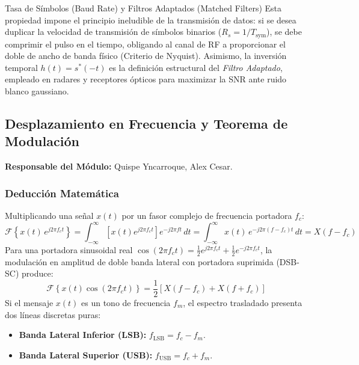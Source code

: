 \documentclass[11pt,a4paper]{article}
\begin{document}
\begin{telecomAppBox}{Tasa de S\'imbolos (Baud Rate) y Filtros Adaptados (Matched Filters)}
Esta propiedad impone el principio ineludible de la transmisi\'on de datos: si se desea duplicar la velocidad de transmisi\'on de s\'imbolos binarios ($R_s = 1/T_{\text{sym}}$), se debe comprimir el pulso en el tiempo, obligando al canal de RF a proporcionar el doble de ancho de banda f\'isico (Criterio de Nyquist). Asimismo, la inversi\'on temporal $h(t) = s^*(-t)$ es la definici\'on estructural del \textit{Filtro Adaptado}, empleado en radares y receptores \'opticos para maximizar la SNR ante ruido blanco gaussiano.
\end{telecomAppBox}

\subsection{Desplazamiento en Frecuencia y Teorema de Modulaci\'on}
\textbf{Responsable del M\'odulo:} Quispe Yncarroque, Alex Cesar.

\subsubsection{Deducci\'on Matem\'atica}
Multiplicando una se\~nal $x(t)$ por un fasor complejo de frecuencia portadora $f_c$:
\begin{equation}
  \mathcal{F}\left\{ x(t) \, e^{j 2\pi f_c t} \right\} = \int_{-\infty}^{\infty} \left[ x(t) e^{j 2\pi f_c t} \right] e^{-j 2\pi f t} \, dt = \int_{-\infty}^{\infty} x(t) \, e^{-j 2\pi (f - f_c) t} \, dt = X(f - f_c)
  \label{eq:freq_shift}
\end{equation}
Para una portadora sinusoidal real $\cos(2\pi f_c t) = \frac{1}{2} e^{j 2\pi f_c t} + \frac{1}{2} e^{-j 2\pi f_c t}$, la modulaci\'on en amplitud de doble banda lateral con portadora suprimida (DSB-SC) produce:
\begin{equation}
  \mathcal{F}\left\{ x(t) \cos(2\pi f_c t) \right\} = \frac{1}{2} \left[ X(f - f_c) + X(f + f_c) \right]
  \label{eq:dsb_sc}
\end{equation}
Si el mensaje $x(t)$ es un tono de frecuencia $f_m$, el espectro trasladado presenta dos l\'ineas discretas puras:
\begin{itemize}[noitemsep]
  \item \textbf{Banda Lateral Inferior (LSB):} $f_{\text{LSB}} = f_c - f_m$.
  \item \textbf{Banda Lateral Superior (USB):} $f_{\text{USB}} = f_c + f_m$.
\end{itemize}
\end{document}
